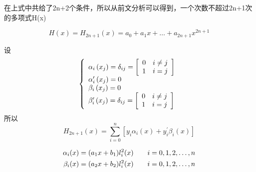 \documentclass[12pt]{article}
\numberwithin{equation}{section}
\begin{document}
	在上式中共给了2n+2个条件，所以从前文分析可以得到，一个次数不超过2n+1次的多项式H(x)

	$$
	H(x) = H_{2n+1}(x) = a_0 + a_1 x + \ldots + a_{2n+1} x^{2n+1}
	$$

	设
	\begin{equation}
		\notag
		\left\{\begin{array}{l}
		\alpha_{i}\left(x_{j}\right)=\delta_{i j}=\left[\begin{array}{ll}
		0 & i \neq j \\
		1 & i=j
		\end{array}\right] \\
		\alpha_{i}^{\prime}\left(x_{j}\right)=0 \\
		\beta_{i}\left(x_{j}\right)=0 \\
		\beta_{i}^{\prime}\left(x_{j}\right)=\delta_{i j}=\left[\begin{array}{ll}
		0 & i \neq j \\
		1 & i=j
		\end{array}\right] \\
		\end{array}\right.
	\end{equation}
	所以
	$$
	H_{2 n+1}(x)=\sum_{i=0}^{n}\left[y_{i} \alpha_{i}(x)+y_{i}^{\prime} \beta_{i}(x)\right]
	$$

	\begin{equation}
		\begin{aligned}
			\notag
			\alpha_i(x) = (a_1 x + b_1)l_{i}^2(x) \quad \quad i = 0, 1, 2, \ldots , n  \\
			\beta_i(x) = (a_2 x + b_2)l_{i}^2(x) \quad \quad i = 0, 1, 2, \ldots , n 
		\end{aligned}
	\end{equation}
\end{document}
